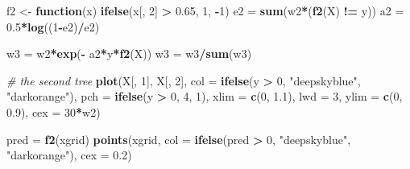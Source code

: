 \documentclass[
]{book}
\newenvironment{Shaded}{\begin{snugshade}}{\end{snugshade}}
\newcommand{\AttributeTok}[1]{\textcolor[rgb]{0.13,0.29,0.53}{#1}}
\newcommand{\CommentTok}[1]{\textcolor[rgb]{0.56,0.35,0.01}{\textit{#1}}}
\newcommand{\ControlFlowTok}[1]{\textcolor[rgb]{0.13,0.29,0.53}{\textbf{#1}}}
\newcommand{\DecValTok}[1]{\textcolor[rgb]{0.00,0.00,0.81}{#1}}
\newcommand{\FloatTok}[1]{\textcolor[rgb]{0.00,0.00,0.81}{#1}}
\newcommand{\FunctionTok}[1]{\textcolor[rgb]{0.13,0.29,0.53}{\textbf{#1}}}
\newcommand{\NormalTok}[1]{#1}
\newcommand{\OtherTok}[1]{\textcolor[rgb]{0.56,0.35,0.01}{#1}}
\newcommand{\SpecialCharTok}[1]{\textcolor[rgb]{0.81,0.36,0.00}{\textbf{#1}}}
\newcommand{\StringTok}[1]{\textcolor[rgb]{0.31,0.60,0.02}{#1}}
\theoremstyle{definition}
\theoremstyle{definition}
\theoremstyle{definition}
\theoremstyle{definition}
\theoremstyle{remark}
\begin{document}
\begin{Shaded}
\begin{Highlighting}[]
\NormalTok{  f2 }\OtherTok{\textless{}{-}} \ControlFlowTok{function}\NormalTok{(x) }\FunctionTok{ifelse}\NormalTok{(x[, }\DecValTok{2}\NormalTok{] }\SpecialCharTok{\textgreater{}} \FloatTok{0.65}\NormalTok{, }\DecValTok{1}\NormalTok{, }\SpecialCharTok{{-}}\DecValTok{1}\NormalTok{)}
\NormalTok{  e2 }\OtherTok{=} \FunctionTok{sum}\NormalTok{(w2}\SpecialCharTok{*}\NormalTok{(}\FunctionTok{f2}\NormalTok{(X) }\SpecialCharTok{!=}\NormalTok{ y))}
\NormalTok{  a2 }\OtherTok{=} \FloatTok{0.5}\SpecialCharTok{*}\FunctionTok{log}\NormalTok{((}\DecValTok{1}\SpecialCharTok{{-}}\NormalTok{e2)}\SpecialCharTok{/}\NormalTok{e2)}
  
\NormalTok{  w3 }\OtherTok{=}\NormalTok{ w2}\SpecialCharTok{*}\FunctionTok{exp}\NormalTok{(}\SpecialCharTok{{-}}\NormalTok{ a2}\SpecialCharTok{*}\NormalTok{y}\SpecialCharTok{*}\FunctionTok{f2}\NormalTok{(X))}
\NormalTok{  w3 }\OtherTok{=}\NormalTok{ w3}\SpecialCharTok{/}\FunctionTok{sum}\NormalTok{(w3)}
  
  \CommentTok{\# the second tree}
  \FunctionTok{plot}\NormalTok{(X[, }\DecValTok{1}\NormalTok{], X[, }\DecValTok{2}\NormalTok{], }\AttributeTok{col =} \FunctionTok{ifelse}\NormalTok{(y }\SpecialCharTok{\textgreater{}} \DecValTok{0}\NormalTok{, }\StringTok{"deepskyblue"}\NormalTok{, }\StringTok{"darkorange"}\NormalTok{),}
       \AttributeTok{pch =} \FunctionTok{ifelse}\NormalTok{(y }\SpecialCharTok{\textgreater{}} \DecValTok{0}\NormalTok{, }\DecValTok{4}\NormalTok{, }\DecValTok{1}\NormalTok{), }\AttributeTok{xlim =} \FunctionTok{c}\NormalTok{(}\DecValTok{0}\NormalTok{, }\FloatTok{1.1}\NormalTok{), }\AttributeTok{lwd =} \DecValTok{3}\NormalTok{,}
       \AttributeTok{ylim =} \FunctionTok{c}\NormalTok{(}\DecValTok{0}\NormalTok{, }\FloatTok{0.9}\NormalTok{), }\AttributeTok{cex =} \DecValTok{30}\SpecialCharTok{*}\NormalTok{w2)}
  
\NormalTok{  pred }\OtherTok{=} \FunctionTok{f2}\NormalTok{(xgrid)}
  \FunctionTok{points}\NormalTok{(xgrid, }\AttributeTok{col =} \FunctionTok{ifelse}\NormalTok{(pred }\SpecialCharTok{\textgreater{}} \DecValTok{0}\NormalTok{, }\StringTok{"deepskyblue"}\NormalTok{, }\StringTok{"darkorange"}\NormalTok{), }
         \AttributeTok{cex =} \FloatTok{0.2}\NormalTok{)}
  

\end{Highlighting}
\end{Shaded}
\end{document}
